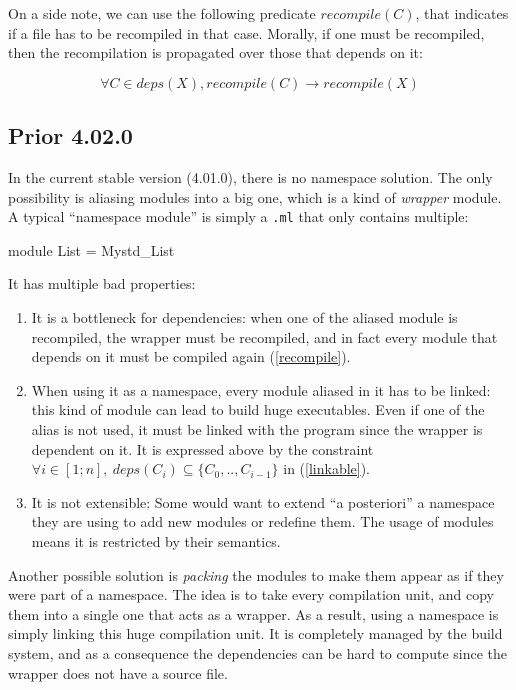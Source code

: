 \documentclass[11pt,a4paper]{article}
\begin{document}
On a side note, we can use the following predicate $recompile(C)$, that
indicates if a file has to be recompiled in that case. Morally, if one must be
recompiled, then the recompilation is propagated over those that depends on it:

\begin{equation}
  \forall C \in deps(X), recompile(C) \rightarrow recompile(X)
\label{recompile}
\end{equation}

\subsection{Prior 4.02.0}

In the current stable version (4.01.0), there is no namespace solution. The only
possibility is aliasing modules into a big one, which is a kind of
\emph{wrapper} module. A typical ``namespace module'' is simply a \texttt{.ml}
that only contains multiple:

\begin{OCaml}
module List = Mystd_List
\end{OCaml}

It has multiple bad properties:
\begin{enumerate}
  \item It is a bottleneck for dependencies: when one of the aliased module is
    recompiled, the wrapper must be recompiled, and in fact every module that
    depends on it must be compiled again (\ref{recompile}).
  \item When using it as a namespace, every module aliased in it has to be
    linked: this kind of module can lead to build huge executables. Even if one
    of the alias is not used, it must be linked with the program since the
    wrapper is dependent on it. It is expressed above by the constraint $
    \forall i \in [1; n], ~deps(C_i) \subseteq \{ C_0, .., C_{i-1} \}$ in
    (\ref{linkable}).
  \item It is not extensible: Some would want to extend ``a posteriori'' a
    namespace they are using to add new modules or redefine them. The usage of
    modules means it is restricted by their semantics.
\end{enumerate}

Another possible solution is \emph{packing} the modules to make them appear as
if they were part of a namespace. The idea is to take every compilation unit,
and copy them into a single one that acts as a wrapper. As a result, using a
namespace is simply linking this huge compilation unit. It is completely managed
by the build system, and as a consequence the dependencies can be hard to
compute since the wrapper does not have a source file.
\end{document}
